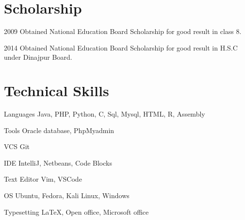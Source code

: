 \documentclass[a4paper]{article}
\begin{document}


\section{Scholarship}

\begin{CV}
\item[2009] Obtained National Education Board Scholarship for good result in class 8.
\item[2014] Obtained National Education Board Scholarship for good result in H.S.C under Dinajpur Board.
\end{CV}


\section{Technical Skills}

\begin{CV}
\item[Languages]  Java, PHP, Python, C, Sql, Mysql, HTML, R, Assembly
\item[Tools] Oracle database, PhpMyadmin
\item[VCS] Git
\item[IDE] IntelliJ, Netbeans, Code Blocks
\item[Text Editor] Vim, VSCode
\item[OS] Ubuntu, Fedora, Kali Linux, Windows
\item[Typesetting] \LaTeX{}, Open office, Microsoft office
\end{CV}
\end{document}
